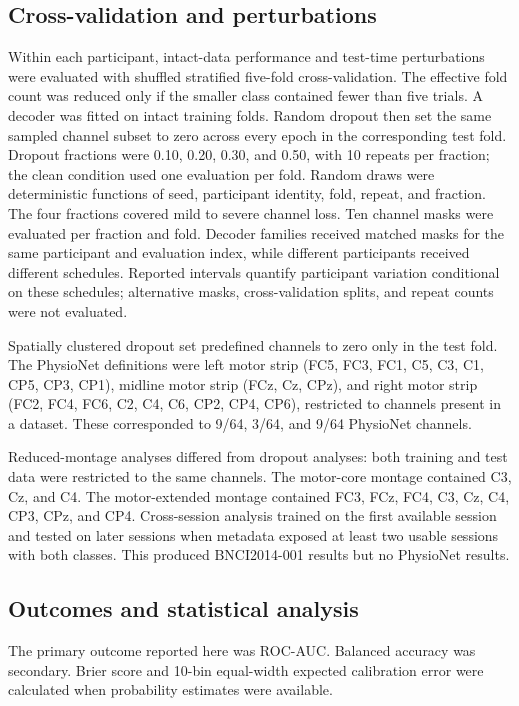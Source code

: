\documentclass[11pt]{article}
\begin{document}
\subsection{Cross-validation and perturbations}
Within each participant, intact-data performance and test-time perturbations were evaluated with shuffled stratified five-fold cross-validation. The effective fold count was reduced only if the smaller class contained fewer than five trials. A decoder was fitted on intact training folds. Random dropout then set the same sampled channel subset to zero across every epoch in the corresponding test fold. Dropout fractions were 0.10, 0.20, 0.30, and 0.50, with 10 repeats per fraction; the clean condition used one evaluation per fold. Random draws were deterministic functions of seed, participant identity, fold, repeat, and fraction. The four fractions covered mild to severe channel loss. Ten channel masks were evaluated per fraction and fold. Decoder families received matched masks for the same participant and evaluation index, while different participants received different schedules. Reported intervals quantify participant variation conditional on these schedules; alternative masks, cross-validation splits, and repeat counts were not evaluated.

Spatially clustered dropout set predefined channels to zero only in the test fold. The PhysioNet definitions were left motor strip (FC5, FC3, FC1, C5, C3, C1, CP5, CP3, CP1), midline motor strip (FCz, Cz, CPz), and right motor strip (FC2, FC4, FC6, C2, C4, C6, CP2, CP4, CP6), restricted to channels present in a dataset. These corresponded to 9/64, 3/64, and 9/64 PhysioNet channels.

Reduced-montage analyses differed from dropout analyses: both training and test data were restricted to the same channels. The motor-core montage contained C3, Cz, and C4. The motor-extended montage contained FC3, FCz, FC4, C3, Cz, C4, CP3, CPz, and CP4. Cross-session analysis trained on the first available session and tested on later sessions when metadata exposed at least two usable sessions with both classes. This produced BNCI2014-001 results but no PhysioNet results.

\subsection{Outcomes and statistical analysis}
The primary outcome reported here was ROC-AUC. Balanced accuracy was secondary. Brier score and 10-bin equal-width expected calibration error were calculated when probability estimates were available.
\end{document}
